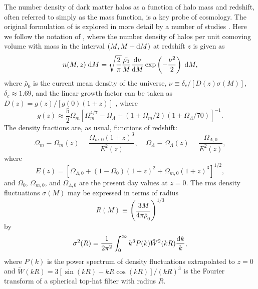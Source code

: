 The number density of dark matter halos as a function of halo mass and redshift, often referred to simply as the mass function, is a key probe of cosmology.  The original formulation of \citet{1974ApJ...187..425P} is explored in more detail by a number of studies \citep[e.g.,][]{2002MNRAS.336..112M, 2006ApJ...646..881W}.  Here we follow the notation of \citet{2002MNRAS.336..112M}, where the number density of halos per unit comoving volume with mass in the interval $(M, M + {\rm {d}} M)$ at redshift $z$ is given as
\begin{equation}
	n(M, z) {\; \rm {d}} M = \sqrt{\frac{2}{\pi}} \frac{\bar{\rho_{0}}}{M} \frac{{\rm {d}} \nu}{{\rm {d}} M} \exp\left( -\frac{\nu^{2}}{2}\right) {\; \rm {d}} M,
\end{equation}
where $\bar{\rho}_{0}$ is the current mean density of the universe, $\nu \equiv \delta_{c} / [D(z) \sigma(M)]$, $\delta_{c} \approx 1.69$, and the linear growth factor can be taken as $D(z) = g(z) / [g(0) (1 + z)]$ \citep{1992ARA&A..30..499C}, where
\begin{equation}
	g(z) \approx \frac{5}{2} \Omega_{m} \left[ \Omega_{m}^{4/7} - \Omega_{\Lambda} + (1 + \Omega_{m} / 2) (1 + \Omega_{\Lambda} / 70) \right]^{-1}.
\end{equation}
The density fractions are, as usual, functions of redshift:
\begin{equation}
	\Omega_{m} \equiv \Omega_{m}(z) = \frac{\Omega_{m,0} ( 1 + z )^{3}}{E^{2}(z)},
	\; \; \; \;
	\Omega_{\Lambda} \equiv \Omega_{\Lambda}(z) = \frac{\Omega_{\Lambda,0}}{E^{2}(z)},
\end{equation}
where
\begin{equation}
	E(z) = \left[ \Omega_{\Lambda,0} + ( 1 - \Omega_{0} ) ( 1 + z )^{2} + \Omega_{m,0} ( 1 + z )^{3} \right]^{1/2},
\end{equation}
and $\Omega_{0}$, $\Omega_{m,0}$, and $\Omega_{\Lambda,0}$ are the present day values at $z = 0$.  The rms density fluctuations $\sigma(M)$ may be expressed in terms of radius
\begin{equation}
	R(M) \equiv \left( \frac{3 M}{4 \pi \bar{\rho}_{0}} \right)^{1/3}
\end{equation}
by
\begin{equation}
	\sigma^{2}(R) = \frac{1}{2 \pi^{2}} \int_{0}^{\infty} k^{3} P(k) \tilde{W}^{2}(k R) \frac{{\rm {d}} k}{k},
\end{equation}
where $P(k)$ is the power spectrum of density fluctuations extrapolated to $z = 0$ and $\tilde{W}( k R ) = 3 [ \sin( k R ) - k R \cos( k R ) ] / ( k R )^{3}$ is the Fourier transform of a spherical top-hat filter with radius $R$.

